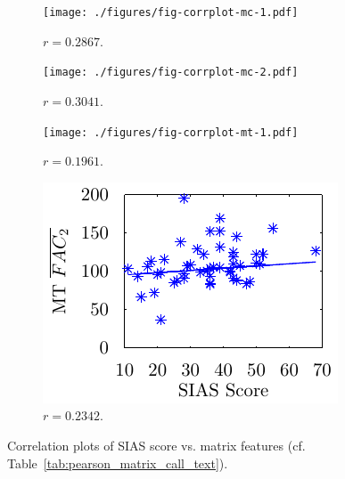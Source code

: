 \begin{figure}
\begin{center}
    \begin{subfigure}[b]{.24\textwidth}
        \texttt{[image: ./figures/fig-corrplot-mc-1.pdf]}
        \caption{$r=0.2867$.}
    \end{subfigure}
    \begin{subfigure}[b]{.24\textwidth}
        \texttt{[image: ./figures/fig-corrplot-mc-2.pdf]}
        \caption{$r=0.3041$.}
    \end{subfigure}
    \begin{subfigure}[b]{.24\textwidth}
        \texttt{[image: ./figures/fig-corrplot-mt-1.pdf]}
        \caption{$r=0.1961$.}
    \end{subfigure}
    \begin{subfigure}[b]{.24\textwidth}
        \includegraphics[width=\textwidth]{./figures/fig-corrplot-mt-2.pdf}
        \caption{$r=0.2342$.}
    \end{subfigure}

    \caption{Correlation plots of SIAS score vs. matrix
    features (cf. Table~\ref{tab:pearson_matrix_call_text}).\label{fig:corr}}
\end{center}
\end{figure}




